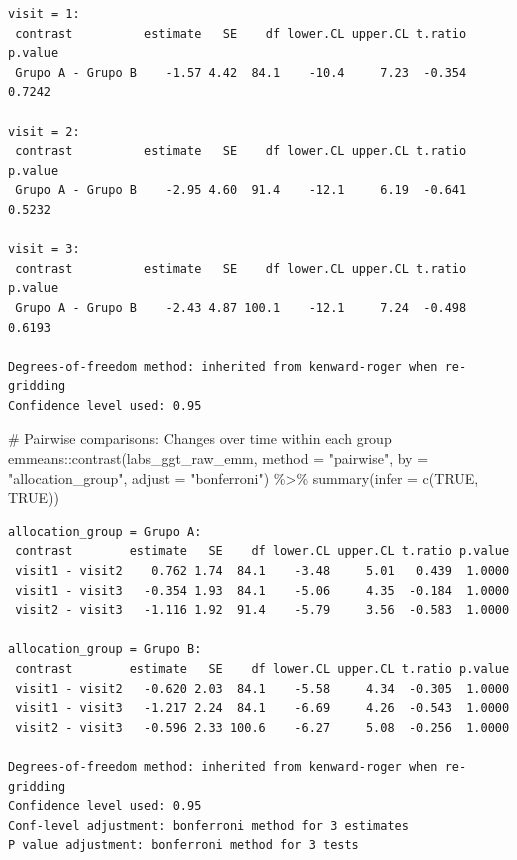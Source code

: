 \documentclass[
  letterpaper,
  DIV=11,
  numbers=noendperiod]{scrartcl}
\newenvironment{Shaded}{\begin{snugshade}}{\end{snugshade}}
\newcommand{\AttributeTok}[1]{\textcolor[rgb]{0.40,0.45,0.13}{#1}}
\newcommand{\CommentTok}[1]{\textcolor[rgb]{0.37,0.37,0.37}{#1}}
\newcommand{\ConstantTok}[1]{\textcolor[rgb]{0.56,0.35,0.01}{#1}}
\newcommand{\FunctionTok}[1]{\textcolor[rgb]{0.28,0.35,0.67}{#1}}
\newcommand{\NormalTok}[1]{\textcolor[rgb]{0.00,0.23,0.31}{#1}}
\newcommand{\SpecialCharTok}[1]{\textcolor[rgb]{0.37,0.37,0.37}{#1}}
\newcommand{\StringTok}[1]{\textcolor[rgb]{0.13,0.47,0.30}{#1}}
\begin{document}
\begin{verbatim}
visit = 1:
 contrast          estimate   SE    df lower.CL upper.CL t.ratio p.value
 Grupo A - Grupo B    -1.57 4.42  84.1    -10.4     7.23  -0.354  0.7242

visit = 2:
 contrast          estimate   SE    df lower.CL upper.CL t.ratio p.value
 Grupo A - Grupo B    -2.95 4.60  91.4    -12.1     6.19  -0.641  0.5232

visit = 3:
 contrast          estimate   SE    df lower.CL upper.CL t.ratio p.value
 Grupo A - Grupo B    -2.43 4.87 100.1    -12.1     7.24  -0.498  0.6193

Degrees-of-freedom method: inherited from kenward-roger when re-gridding 
Confidence level used: 0.95 
\end{verbatim}

\begin{Shaded}
\begin{Highlighting}[]
\CommentTok{\# Pairwise comparisons: Changes over time within each group}
\NormalTok{emmeans}\SpecialCharTok{::}\FunctionTok{contrast}\NormalTok{(labs\_ggt\_raw\_emm, }\AttributeTok{method =} \StringTok{"pairwise"}\NormalTok{, }\AttributeTok{by =} \StringTok{"allocation\_group"}\NormalTok{, }\AttributeTok{adjust =} \StringTok{"bonferroni"}\NormalTok{) }\SpecialCharTok{\%\textgreater{}\%} \FunctionTok{summary}\NormalTok{(}\AttributeTok{infer =} \FunctionTok{c}\NormalTok{(}\ConstantTok{TRUE}\NormalTok{, }\ConstantTok{TRUE}\NormalTok{))}
\end{Highlighting}
\end{Shaded}

\begin{verbatim}
allocation_group = Grupo A:
 contrast        estimate   SE    df lower.CL upper.CL t.ratio p.value
 visit1 - visit2    0.762 1.74  84.1    -3.48     5.01   0.439  1.0000
 visit1 - visit3   -0.354 1.93  84.1    -5.06     4.35  -0.184  1.0000
 visit2 - visit3   -1.116 1.92  91.4    -5.79     3.56  -0.583  1.0000

allocation_group = Grupo B:
 contrast        estimate   SE    df lower.CL upper.CL t.ratio p.value
 visit1 - visit2   -0.620 2.03  84.1    -5.58     4.34  -0.305  1.0000
 visit1 - visit3   -1.217 2.24  84.1    -6.69     4.26  -0.543  1.0000
 visit2 - visit3   -0.596 2.33 100.6    -6.27     5.08  -0.256  1.0000

Degrees-of-freedom method: inherited from kenward-roger when re-gridding 
Confidence level used: 0.95 
Conf-level adjustment: bonferroni method for 3 estimates 
P value adjustment: bonferroni method for 3 tests 
\end{verbatim}
\end{document}
